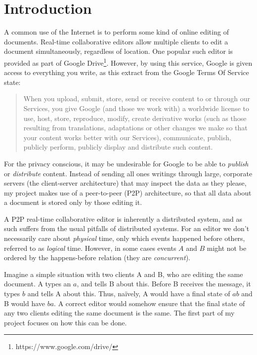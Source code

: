 \documentclass[diss.tex]{subfiles}
\begin{document}
\chapter{Introduction}
\label{chap:introduction}
A common use of the Internet is to perform some kind of online editing of documents. Real-time collaborative editors allow multiple clients to edit a document simultaneously, regardless of location. One popular such editor is provided as part of Google Drive\footnote{https://www.google.com/drive/}. However, by using this service, Google is given access to everything you write, as this extract from the Google Terms Of Service state: \begin{quote}
When you upload, submit, store, send or receive content to or through our Services, you give Google (and those we work with) a worldwide license to use, host, store, reproduce, modify, create derivative works (such as those resulting from translations, adaptations or other changes we make so that your content works better with our Services), communicate, publish, publicly perform, publicly display and distribute such content.
\end{quote} 
For the privacy conscious, it may be undesirable for Google to be able to \textit{publish} or \textit{distribute} content. Instead of sending all ones writings through large, corporate servers (the client-server architecture) that may inspect the data as they please, my project makes use of a peer-to-peer (P2P) architecture, so that all data about a document is stored only by those editing it.

A P2P real-time collaborative editor is inherently a distributed system, and as such suffers from the usual pitfalls of distributed systems. For an editor we don't necessarily care about \textit{physical} time, only which events happened before others, referred to as \textit{logical} time. However, in some cases events $A$ and $B$ might not be ordered by the happens-before \cite{lamportshappensbefore} relation (they are \textit{concurrent}).

Imagine a simple situation with two clients A and B, who are editing the same document. A types an $a$, and tells B about this. Before B receives the message, it types $b$ and tells A about this. Thus, na{\"i}vely, A would have a final state of $ab$ and B would have $ba$. A correct editor would somehow ensure that the final state of any two clients editing the same document is the same. The first part of my project focuses on how this can be done.
\end{document}
